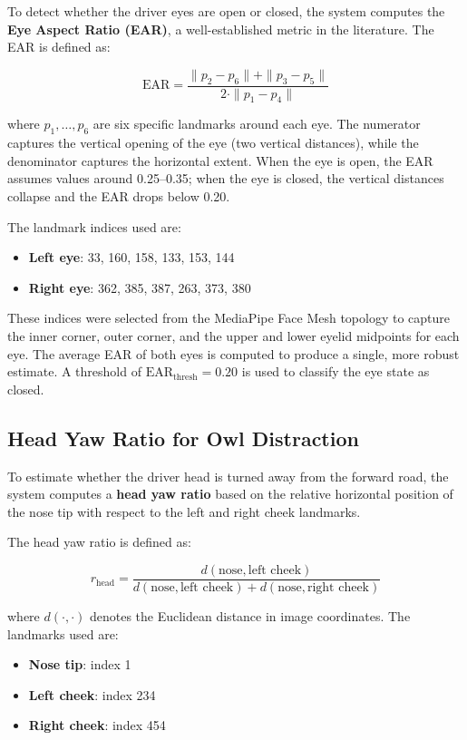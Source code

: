 \documentclass[12pt,a4paper]{article}
\begin{document}
To detect whether the driver eyes are open or closed, the system computes the \textbf{Eye Aspect Ratio (EAR)}, a well-established metric in the literature. The EAR is defined as:

\begin{equation}\label{eq:ear}
    \text{EAR} = \frac{\|p_2 - p_6\| + \|p_3 - p_5\|}{2 \cdot \|p_1 - p_4\|}
\end{equation}

\noindent where $p_1, \ldots, p_6$ are six specific landmarks around each eye. The numerator captures the vertical opening of the eye (two vertical distances), while the denominator captures the horizontal extent. When the eye is open, the EAR assumes values around 0.25--0.35; when the eye is closed, the vertical distances collapse and the EAR drops below 0.20.

The landmark indices used are:
\begin{itemize}[noitemsep]
    \item \textbf{Left eye}: 33, 160, 158, 133, 153, 144
    \item \textbf{Right eye}: 362, 385, 387, 263, 373, 380
\end{itemize}

These indices were selected from the MediaPipe Face Mesh topology to capture the inner corner, outer corner, and the upper and lower eyelid midpoints for each eye. The average EAR of both eyes is computed to produce a single, more robust estimate. A threshold of $\text{EAR}_{\text{thresh}} = 0.20$ is used to classify the eye state as closed.

\subsection{Head Yaw Ratio for Owl Distraction}\label{subsec:headyaw}

To estimate whether the driver head is turned away from the forward road, the system computes a \textbf{head yaw ratio} based on the relative horizontal position of the nose tip with respect to the left and right cheek landmarks.

The head yaw ratio is defined as:

\begin{equation}\label{eq:headyaw}
    r_{\text{head}} = \frac{d(\text{nose}, \text{left cheek})}{d(\text{nose}, \text{left cheek}) + d(\text{nose}, \text{right cheek})}
\end{equation}

\noindent where $d(\cdot, \cdot)$ denotes the Euclidean distance in image coordinates. The landmarks used are:
\begin{itemize}[noitemsep]
    \item \textbf{Nose tip}: index 1
    \item \textbf{Left cheek}: index 234
    \item \textbf{Right cheek}: index 454
\end{itemize}
\end{document}
